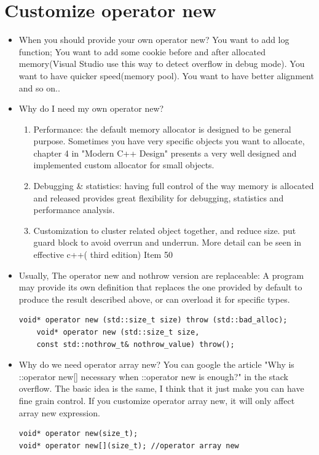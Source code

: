 \documentclass[a4paper,11pt,twoside]{book}
\begin{document}
\section{Customize operator new}
\begin{itemize}
	\item When you should provide your own operator new?  You want to add log function; You want to add some cookie before and after allocated memory(Visual Studio use this way to detect overflow in debug mode). You want to have quicker speed(memory pool). You want to have better alignment and so on..
	
	\item Why do I need my own operator new?
	\begin{enumerate}
		\item Performance: the default memory allocator is designed to be general purpose. Sometimes you have very specific objects you want to allocate, chapter 4 in "Modern C++ Design" presents a very well designed and implemented custom allocator for small objects.
		
		\item Debugging \& statistics: having full control of the way memory is allocated and released provides great flexibility for debugging, statistics and performance analysis.
		
		\item Customization to cluster related object together, and reduce size. put guard block to avoid overrun and underrun. More detail can be seen in effective c++( third edition) Item 50
	\end{enumerate}
	
	\item Usually, The operator new and nothrow version are replaceable: A program may provide its own definition that replaces the one provided by default to produce the result described above, or can overload it for specific types. 
\begin{lstlisting}[numbers=none]
	void* operator new (std::size_t size) throw (std::bad_alloc);
	void* operator new (std::size_t size, 
	const std::nothrow_t& nothrow_value) throw();
\end{lstlisting}

\item Why do we need operator array new? You can google the article "Why is ::operator new[] necessary when ::operator new is enough?" in the stack overflow. The basic idea is the same, I think that it just make you can have fine grain control. If you customize operator array new, it will only affect array new expression.  
\begin{lstlisting}[numbers=none]
void* operator new(size_t);
void* operator new[](size_t); //operator array new


\end{lstlisting}
\end{itemize}
\end{document}
